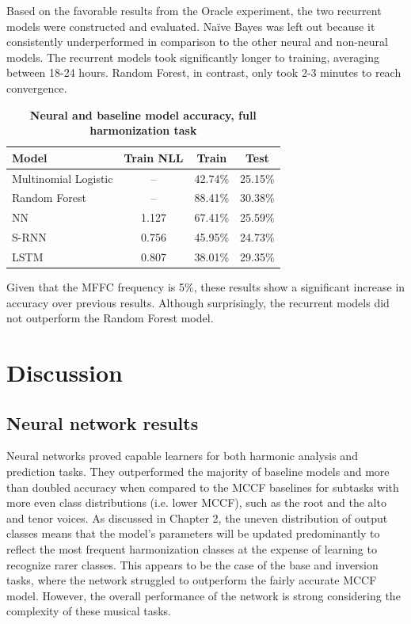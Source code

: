 \documentclass[11pt]{book}
\begin{document}
Based on the favorable results from the Oracle experiment, the two recurrent models were constructed and evaluated. Na{\"i}ve Bayes was left out because it consistently underperformed in comparison to the other neural and non-neural models. The recurrent models took significantly longer to training, averaging between 18-24 hours. Random Forest, in contrast, only took 2-3 minutes to reach convergence. 

\begin{table}[h]
\begin{center}
\caption[Table caption text]{\textbf{Neural and baseline model accuracy, full harmonization task}}
\begin{tabular}{l c c c }
Model & Train NLL & Train & Test \\ \hline
Multinomial Logistic & -- & 42.74\% & 25.15\% \\
Random Forest & -- & 88.41\% & 30.38\% \\ \hline
NN & 1.127 & 67.41\% & 25.59\% \\
S-RNN & 0.756 & 45.95\% & 24.73\% \\
LSTM & 0.807 & 38.01\% & 29.35\%
\end{tabular}
\end{center}
\end{table}

Given that the MFFC frequency is 5\%, these results show a significant increase in accuracy over previous results. Although surprisingly, the recurrent models did not outperform the Random Forest model.



\section{Discussion}

\subsection{Neural network results}

Neural networks proved capable learners for both harmonic analysis and prediction tasks. They outperformed the majority of baseline models and more than doubled accuracy when compared to the MCCF baselines for subtasks with more even class distributions (i.e. lower MCCF), such as the root and the alto and tenor voices. As discussed in Chapter 2, the uneven distribution of output classes means that the model's parameters will be updated predominantly to reflect the most frequent harmonization classes at the expense of learning to recognize rarer classes. This appears to be the case of the base and inversion tasks, where the network struggled to outperform the fairly accurate MCCF model. However, the overall performance of the network is strong considering the complexity of these musical tasks. \\
\end{document}
